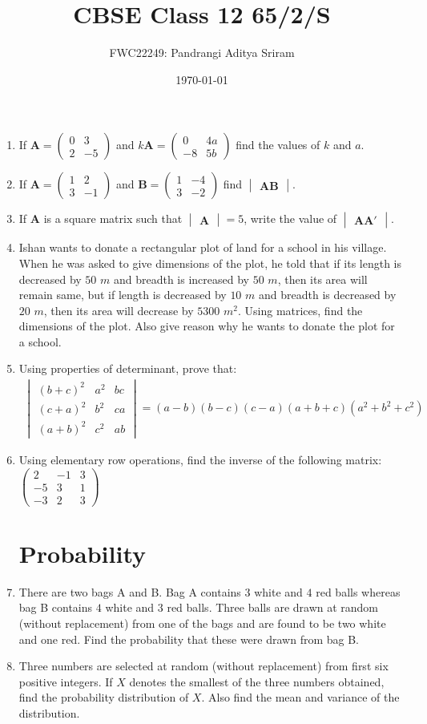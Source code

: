 \documentclass[12pt,-letter paper]{article}
\title{CBSE Class 12 65/2/S}
\date{\today}
\author{FWC22249: Pandrangi Aditya Sriram}
\providecommand{\brak}[1]{\ensuremath{\left(#1\right)}}
\theoremstyle{remark}
\newcommand{\myvec}[1]{\ensuremath{\begin{pmatrix}#1\end{pmatrix}}}
\newcommand{\mydet}[1]{\ensuremath{\begin{vmatrix}#1\end{vmatrix}}}
\let\vec\mathbf
\begin{document}
\maketitle

\begin{enumerate}
\section{Matrices}
\item If $\vec{A} = \myvec{0 & 3 \\ 2 & -5}$ and $k\vec{A} = \myvec{0 & 4a \\ -8 & 5b}$ find the values of $k$ and $a$.
\item If $\vec{A} = \myvec{1 & 2 \\ 3 & -1}$ and $\vec{B} = \myvec{1 & -4 \\ 3 & -2}$ find $\mydet{\vec{A}\vec{B}}$.
\item If $\vec{A}$ is a square matrix such that $\mydet{\vec{A}} = 5$, write the value of $\mydet{\vec{A}\vec{A}'}$.
\item Ishan wants to donate a rectangular plot of land for a school in his village. When he was asked to give dimensions of the plot, he told that if its length is decreased by $50$ $m$ and breadth is increased by $50$ $m$, then its area will remain same, but if length is decreased by $10$ $m$ and breadth is decreased by $20$ $m$, then its area will decrease by $5300$ $m^2$. Using matrices, find the dimensions of the plot. Also give reason why he wants to donate the plot for a school.
\item Using properties of determinant, prove that:
\begin{align*}
\mydet{\brak{b+c}^2 & a^2 & bc \\ \brak{c+a}^2 & b^2 & ca \\ \brak{a+b}^2 & c^2 & ab} = \brak{a-b}\brak{b-c}\brak{c-a}\brak{a+b+c}\brak{a^2 + b^2 + c^2}
\end{align*}
\item Using elementary row operations, find the inverse of the following matrix: $\myvec{2 & -1 & 3 \\ -5 & 3 & 1 \\ -3 & 2 & 3}$
\section{Probability}
\item There are two bags A and B. Bag A contains $3$ white and $4$ red balls whereas bag B contains $4$ white and $3$ red balls. Three balls are drawn at random (without replacement) from one of the bags and are found to be two white and one red. Find the probability that these were drawn from bag B.
\item Three numbers are selected at random (without replacement) from first six positive integers. If $X$ denotes the smallest of the three numbers obtained, find the probability distribution of $X$. Also find the mean and variance of the distribution.

\end{enumerate}
\end{document}
